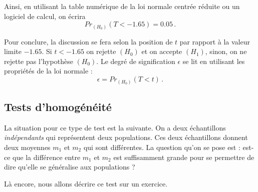 \documentclass[12pt, a4paper]{book}
\numberwithin{equation}{section}
\begin{document}
\begin{center}
\end{center}

Ainsi, en utilisant la table numérique de la loi normale centrée réduite ou un logiciel de calcul, on écrira 
$$
Pr_{(H_0)}(T<-1.65)=0.05\,.
$$

Pour conclure, la discussion se fera selon la position de $t$ par rapport à la valeur limite $-1.65$.
Si $t<-1.65$ on rejette $(H_0)$ et on accepte $(H_1)$, sinon, on ne rejette pas l'hypothèse $(H_0)$. 
Le degré de signification $\epsilon$ se lit en utilisant les propriétés de la loi normale :
$$
\epsilon = Pr_{(H_0)}(T<t)\,.
$$




\subsection{Tests d'homogénéité} 

La situation pour ce type de test est la suivante. 
On a deux échantillons {\it indépendants} qui représentent deux populations. Ces deux échantillons
donnent deux moyennes $m_1$ et $m_2$ qui sont différentes. La question qu'on se pose est :
est-ce que la différence entre $m_1$ et $m_2$ est suffisamment grande pour se permettre de dire
qu'elle se généralise aux populations ?

Là encore, nous allons décrire ce test sur un exercice.\\
\end{document}
